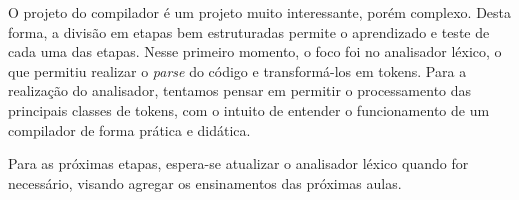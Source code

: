 
O projeto do compilador é um projeto muito interessante, porém complexo. Desta forma, a divisão em etapas bem estruturadas permite o aprendizado e teste de cada uma das etapas. Nesse primeiro momento, o foco foi no analisador léxico, o que permitiu realizar o \emph{parse} do código e transformá-los em tokens. Para a realização do analisador, tentamos pensar em permitir o processamento das principais classes de tokens, com o intuito de entender o funcionamento de um compilador de forma prática e didática.

Para as próximas etapas, espera-se atualizar o analisador léxico quando for necessário, visando agregar os ensinamentos das próximas aulas.
